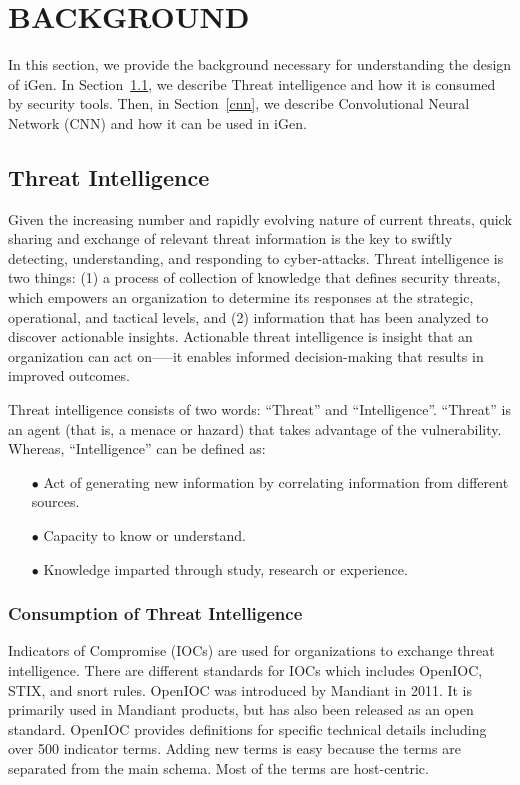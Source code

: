 \chapter{BACKGROUND} \label{chap:background}
In this section, we provide the background necessary for understanding the design of iGen. In Section~\ref{ti}, we describe Threat intelligence and how it is consumed by security tools. Then, in Section~\ref{cnn}, we describe Convolutional Neural Network (CNN) and how it can be used in iGen.  

\section{Threat Intelligence} \label{ti}

Given the increasing number and rapidly evolving nature of current threats, quick sharing and exchange of relevant threat information is the key to swiftly detecting, understanding, and responding to cyber-attacks. Threat intelligence is two things: (1) a process of collection of knowledge that defines security threats, which empowers an organization to determine its responses at the strategic, operational, and tactical levels, and (2) information that has been analyzed to discover actionable insights. Actionable threat intelligence is insight that an organization can act on—--it enables informed decision-making that results in improved outcomes. 

Threat intelligence consists of two words: “Threat” and “Intelligence”. “Threat” is an agent (that is, a menace or hazard) that takes advantage of the vulnerability. Whereas, “Intelligence” can be defined as: 
\begin{itemize}
 \item[$\bullet$ ] Act of generating new information by correlating information from different sources.
  \item[$\bullet$ ] Capacity to know or understand.
  \item[$\bullet$ ] Knowledge imparted through study, research or experience.
\end{itemize}


\subsection{Consumption of Threat Intelligence}

Indicators of Compromise (IOCs) are used for organizations to exchange threat intelligence. There are different standards for IOCs which includes OpenIOC, STIX, and snort rules. OpenIOC was introduced by Mandiant in 2011.  It is primarily used in Mandiant products, but has also been released as an open standard. OpenIOC provides definitions for specific technical details including over 500 indicator terms. Adding new terms is easy because the terms are separated from the main schema. Most of the terms are host-centric.

